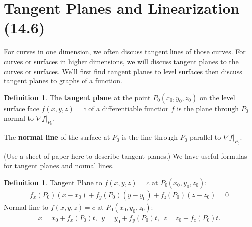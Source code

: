 \documentclass[12pt, letter]{article}
\theoremstyle{plain}
\numberwithin{theorem}{section}
\theoremstyle{definition}
\newtheorem{definition}[theorem]{Definition}
\begin{document}
\newpage


\section{Tangent Planes and Linearization (14.6)}

For curves in one dimension, we often discuss tangent lines of those curves. For curves or surfaces in higher dimensions, we will discuss tangent planes to the curves or surfaces. We'll first find tangent planes to level surfaces then discuss tangent planes to graphs of a function.

\bigskip

\begin{definition}
The \textbf{tangent plane} at the point $P_0(x_0,y_0,z_0)$ on the level surface face $f(x,y,z) = c$ of a differentiable function $f$ is the plane through $P_0$ normal to $\nabla f \rvert_{P_0}$.

\smallskip

The \textbf{normal line} of the surface at $P_0$ is the line through $P_0$ parallel to $\nabla f \rvert_{P_0}$.
\end{definition}

\bigskip

(Use a sheet of paper here to describe tangent planes.) We have useful formulas for tangent planes and normal lines.

\bigskip

\begin{definition}
Tangent Plane to $f(x,y,z)=c$ at $P_0(x_0,y_0,z_0)$:
\begin{align*}
f_x(P_0)(x-x_0) + f_y(P_0)(y-y_0) + f_z(P_0)(z-z_0) = 0
\end{align*}
Normal line to $f(x,y,z)=c$ at $P_0(x_0,y_0,z_0)$:
\begin{align*}
x=x_0+f_x(P_0)t, \ \ y=y_0+f_y(P_0)t, \ \ z=z_0+f_z(P_0)t.
\end{align*}
\end{definition}

\bigskip

\hrulefill

\bigskip
\end{document}
